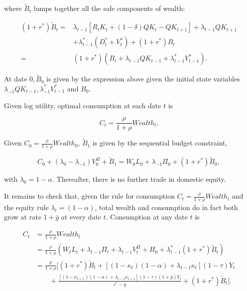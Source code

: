 \documentclass[11pt]{article}
\begin{document}
where $\tilde{B}_{t}$ lumps together all the safe components of wealth:


\[
\begin{aligned}
(1+r^*)\widetilde B_t={}&\lambda_{t-1}[R_tK_t+(1-\delta)QK_t-QK_{t+1}]+\lambda_{t-1}QK_{t+1}\\
&+\lambda_{t-1}^*(D_t^*+V_t^*)+(1+r^*)B_t\\
={}&(1+r^*)\left(B_t+\lambda_{t-1}QK_{t-1}+\lambda_{t-1}^*V_{t-1}^*\right).
\end{aligned}
\]%


At date $0,\tilde{B}_{0}$ is given by the expression above given the initial state variables $\lambda _{-1}QK_{t-1},\lambda _{-1}^{*}V_{t-1}^{*}$ and $B_{0}$.

Given log utility, optimal consumption at each date $t$ is


\[
C_t=\frac{\rho}{1+\rho}\mathit{Wealth}_t.
\]


Given $C_0=\frac{\rho}{1+\rho}\mathit{Wealth}_0$, $\widetilde B_1$ is given by the sequential budget constraint,


\[
C_0+(\lambda_0-\lambda_{-1})V_0^{\Pi}+\widetilde B_1=W_0L_0+\lambda_{-1}\Pi_0+(1+r^*)\widetilde B_0,
\]


with $\lambda _{0}=1-\alpha $. Thereafter, there is no further trade in domestic equity.


It remains to check that, given the rule for consumption $C_t=\frac{\rho}{1+\rho}\mathit{Wealth}_t$ and the equity rule $\lambda_t=(1-\alpha)$, total wealth and consumption do in fact both grow at rate $1+\bar g$ at every date $t$. Consumption at any date $t$ is


\[
\begin{aligned}
C_t&=\frac{\rho}{1+\rho}\mathit{Wealth}_t\\
&=\frac{\rho}{1+\rho}\left(W_tL_t+\lambda_{t-1}\Pi_t+\lambda_{t-1}V_t^{\Pi}+H_0+\lambda_{t-1}^*(1+r^*)\widetilde B_t\right)\\
&=\frac{\rho}{1+\rho}\Biggl[(1+r^*)\widetilde B_t+\left[(1-\kappa_t)(1-\alpha)+\lambda_{t-1}\kappa_t\right](1-\tau)Y_t\\
&\qquad+\frac{\left[(1-\kappa_{t+1})(1-\alpha)+\lambda_{t-1}\kappa_{t+1}\right](1-\tau)(1+\bar g)Y_t}{r^*-\bar g}
+(1+r^*)\widetilde B_t\Biggr].
\end{aligned}
\]
\end{document}

